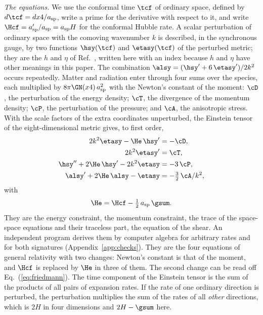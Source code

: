 \emph{The equations.} We use the conformal time $\tcf$ of ordinary space, defined by
$d\tcf=dx4/a_{\mathrm{sp}}$, write a prime for the derivative with respect to it, and write
$\Hcf=a_{\mathrm{sp}}'/a_{\mathrm{sp}}=a_{\mathrm{sp}}H$ for the conformal Hubble rate. A scalar
perturbation of ordinary space with the comoving wavenumber $k$ is described, in the synchronous
gauge, by two functions $\hsy(\tcf)$ and $\etasy(\tcf)$ of the perturbed metric; they are the $h$
and $\eta$ of Ref.~\cite{MaBertschinger1995}, written here with an index because $h$ and $\eta$ have
other meanings in this paper. The combination
$\alsy=(\hsy'+6\,\etasy')/2k^{2}$ occurs repeatedly. Matter and radiation enter through four sums
over the species, each multiplied by $8\pi\GN(x4)\,a_{\mathrm{sp}}^{2}$ with the Newton's constant of
the moment: $\cD$, the perturbation of the energy density; $\cT$, the divergence of the momentum
density; $\cP$, the perturbation of the pressure; and $\cA$, the anisotropic stress. With the scale
factors of the extra coordinates unperturbed, the Einstein tensor of the eight-dimensional metric
gives, to first order,
\begin{subequations}
\label{eq:pert}
\begin{align}
2k^{2}\etasy-\He\,\hsy'&=-\cD,\label{eq:E}\\
2k^{2}\etasy'&=\cT,\label{eq:M}\\
\hsy''+2\He\,\hsy'-2k^{2}\etasy&=-3\,\cP,\label{eq:T}\\
\alsy'+2\He\,\alsy-\etasy&=-\tfrac32\,\cA/k^{2},\label{eq:S}
\end{align}
\end{subequations}
with
\begin{equation}
\He=\Hcf-\tfrac12\,a_{\mathrm{sp}}\,\gsum .
\label{eq:He}
\end{equation}
They are the energy constraint, the momentum constraint, the trace of the space-space equations and
their traceless part, the equation of the shear. An independent program derives them by computer
algebra for arbitrary rates and for both signatures (Appendix~\ref{app:checks}). They are the four
equations of general relativity \cite{MaBertschinger1995} with two changes: Newton's constant is
that of the moment, and $\Hcf$ is replaced by $\He$ in three of them. The second change can be read
off Eq.~(\ref{eq:friedmann}). The time component of the Einstein tensor is the sum of the products
of all pairs of expansion rates. If the rate of one ordinary direction is perturbed, the
perturbation multiplies the sum of the rates of all \emph{other} directions, which is $2H$ in four
dimensions and $2H-\gsum$ here.


